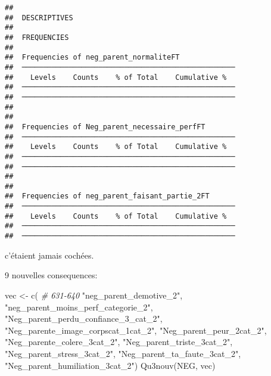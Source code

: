 \documentclass[
]{article}
\newenvironment{Shaded}{\begin{snugshade}}{\end{snugshade}}
\newcommand{\CommentTok}[1]{\textcolor[rgb]{0.56,0.35,0.01}{\textit{#1}}}
\newcommand{\FunctionTok}[1]{\textcolor[rgb]{0.00,0.00,0.00}{#1}}
\newcommand{\NormalTok}[1]{#1}
\newcommand{\OtherTok}[1]{\textcolor[rgb]{0.56,0.35,0.01}{#1}}
\newcommand{\StringTok}[1]{\textcolor[rgb]{0.31,0.60,0.02}{#1}}
\begin{document}
\begin{verbatim}
## 
##  DESCRIPTIVES
## 
##  FREQUENCIES
## 
##  Frequencies of neg_parent_normaliteFT              
##  ────────────────────────────────────────────────── 
##    Levels    Counts    % of Total    Cumulative %   
##  ────────────────────────────────────────────────── 
##  ────────────────────────────────────────────────── 
## 
## 
##  Frequencies of Neg_parent_necessaire_perfFT        
##  ────────────────────────────────────────────────── 
##    Levels    Counts    % of Total    Cumulative %   
##  ────────────────────────────────────────────────── 
##  ────────────────────────────────────────────────── 
## 
## 
##  Frequencies of neg_parent_faisant_partie_2FT       
##  ────────────────────────────────────────────────── 
##    Levels    Counts    % of Total    Cumulative %   
##  ────────────────────────────────────────────────── 
##  ──────────────────────────────────────────────────
\end{verbatim}

c'étaient jamais cochées.

9 nouvelles consequences:

\begin{Shaded}
\begin{Highlighting}[]
\NormalTok{vec }\OtherTok{\textless{}{-}} \FunctionTok{c}\NormalTok{(  }\CommentTok{\# 631{-}640}
  \StringTok{"neg\_parent\_demotive\_2"}\NormalTok{,}
  \StringTok{"neg\_parent\_moins\_perf\_categorie\_2"}\NormalTok{,}
  \StringTok{"Neg\_parent\_perdu\_confiance\_3\_cat\_2"}\NormalTok{,}
  \StringTok{"Neg\_parente\_image\_corpscat\_1cat\_2"}\NormalTok{,}
  \StringTok{"Neg\_parent\_peur\_2cat\_2"}\NormalTok{,}
  \StringTok{"Neg\_parente\_colere\_3cat\_2"}\NormalTok{,}
  \StringTok{"Neg\_parent\_triste\_3cat\_2"}\NormalTok{,}
  \StringTok{"Neg\_parent\_stress\_3cat\_2"}\NormalTok{,}
  \StringTok{"Neg\_parent\_ta\_faute\_3cat\_2"}\NormalTok{,}
  \StringTok{"Neg\_parent\_humiliation\_3cat\_2"}\NormalTok{)}
\FunctionTok{Qu3nouv}\NormalTok{(NEG, vec)}
\end{Highlighting}
\end{Shaded}
\end{document}
